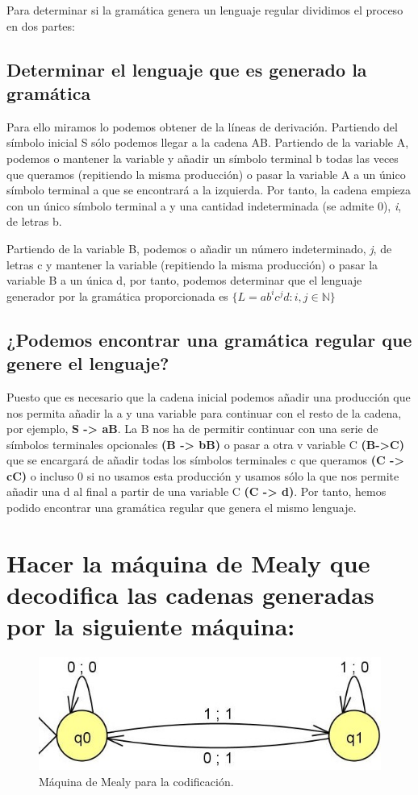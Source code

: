 Para determinar si la gramática genera un lenguaje regular dividimos el proceso en dos partes:

\subsection{Determinar el lenguaje que es generado la gramática}
Para ello miramos lo podemos obtener de la líneas de derivación. Partiendo del símbolo inicial S sólo podemos llegar a la cadena AB. \newline 
Partiendo de la variable A, podemos o mantener la variable y añadir un símbolo terminal b todas las veces que queramos (repitiendo la misma producción) o pasar la variable A a un único símbolo terminal a que se encontrará a la izquierda. Por tanto, la cadena empieza con un único símbolo terminal a y  una cantidad indeterminada (se admite 0), \textit{i}, de letras b. \newline

Partiendo de la variable B, podemos o añadir un número indeterminado, \textit{j}, de letras c y mantener la variable (repitiendo la misma producción) o pasar la variable B a un única d, por tanto, podemos determinar que el lenguaje generador por la gramática proporcionada es \textbf{$\{L = ab^{i}c^{j}d : i, j \in \mathbb{N} \}$}

\subsection{¿Podemos encontrar una gramática regular que genere el lenguaje?}
Puesto que es necesario que la cadena inicial podemos añadir una producción que nos permita añadir la a y una variable para continuar con el resto de la cadena, por ejemplo, \textbf{S -> \space aB}. La B nos ha de permitir continuar con una serie de símbolos terminales opcionales \textbf{(B -> \space bB)} o pasar a otra v variable C \textbf{(B->C)} que se encargará de añadir todas los símbolos terminales c que queramos \textbf{(C -> \space cC)} o incluso 0 si no usamos esta producción y usamos sólo la que nos permite añadir una d al final a partir de una variable C \textbf{(C -> \space d)}. Por tanto, hemos podido encontrar una gramática regular que genera el mismo lenguaje.

\section{Hacer la máquina de Mealy que decodifica las cadenas generadas por la siguiente máquina:}
\begin{figure}[H]
	\centering
	\includegraphics[scale=0.5]{ejer3-codifica.jpg}
	\caption{Máquina de Mealy para la codificación.}
\end{figure}

